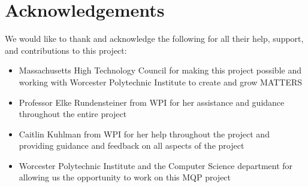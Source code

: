 \chapter{Acknowledgements}
	
We would like to thank and acknowledge the following for all their help, support, and contributions to this project:
\begin{itemize}
	\item Massachusetts High Technology Council for making this project possible and working with Worcester Polytechnic Institute to create and grow MATTERS
	
	\item Professor Elke Rundensteiner from WPI for her assistance and guidance throughout the entire project
	
	\item Caitlin Kuhlman from WPI for her help throughout the project and providing guidance and feedback on all aspects of the project
	
	\item Worcester Polytechnic Institute and the Computer Science department for allowing us the opportunity to work on this MQP project 
\end{itemize}
